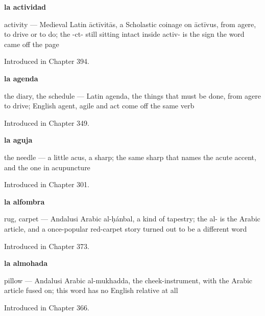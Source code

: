 \noindent\begin{minipage}[t]{\linewidth}
\raggedright
\textbf{la actividad}\par
\small activity — Medieval Latin āctīvitās, a Scholastic coinage on āctīvus, from agere, to drive or to do; the -ct- still sitting intact inside activ- is the sign the word came off the page\par
\footnotesize Introduced in Chapter 394.
\end{minipage}\par\medskip

\noindent\begin{minipage}[t]{\linewidth}
\raggedright
\textbf{la agenda}\par
\small the diary, the schedule — Latin agenda, the things that must be done, from agere to drive; English agent, agile and act come off the same verb\par
\footnotesize Introduced in Chapter 349.
\end{minipage}\par\medskip

\noindent\begin{minipage}[t]{\linewidth}
\raggedright
\textbf{la aguja}\par
\small the needle — a little acus, a sharp; the same sharp that names the acute accent, and the one in acupuncture\par
\footnotesize Introduced in Chapter 301.
\end{minipage}\par\medskip

\noindent\begin{minipage}[t]{\linewidth}
\raggedright
\textbf{la alfombra}\par
\small rug, carpet — Andalusi Arabic al-ḥánbal, a kind of tapestry; the al- is the Arabic article, and a once-popular red-carpet story turned out to be a different word\par
\footnotesize Introduced in Chapter 373.
\end{minipage}\par\medskip

\noindent\begin{minipage}[t]{\linewidth}
\raggedright
\textbf{la almohada}\par
\small pillow — Andalusi Arabic al-mukhadda, the cheek-instrument, with the Arabic article fused on; this word has no English relative at all\par
\footnotesize Introduced in Chapter 366.
\end{minipage}\par\medskip

